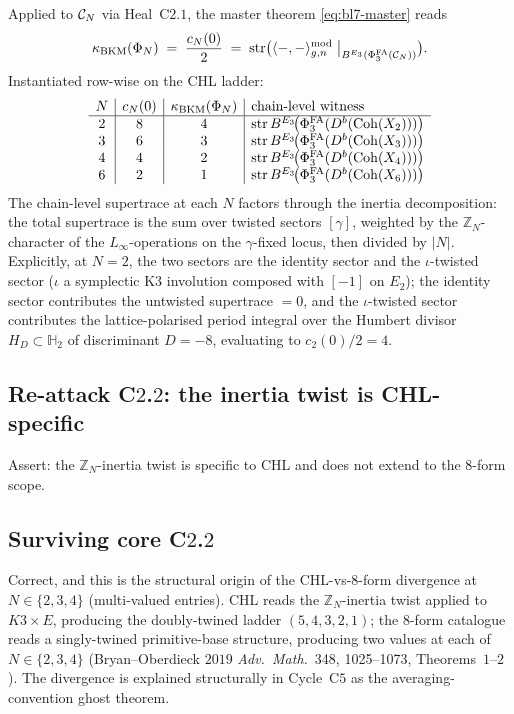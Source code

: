 Applied to $\mathcal{C}_N$ via Heal~C$2$.$1$, the master theorem
\eqref{eq:bl7-master} reads
\[
 \kappa_{\mathrm{BKM}}(\Phi_N) \;=\; \frac{c_N(0)}{2} \;=\;
   \mathrm{str}\bigl(
        \langle -, - \rangle^{\mathrm{mod}}_{g, n}
        \bigm|_{B^{E_{3}}(\Phi^{\mathrm{FA}}_{3}(\mathcal{C}_N))}
    \bigr).
\]
Instantiated row-wise on the CHL ladder:
\[
\begin{array}{c|c|c|l}
 N & c_N(0) & \kappa_{\mathrm{BKM}}(\Phi_N) & \text{chain-level witness} \\ \hline
 2 & 8 & 4 & \mathrm{str}\,B^{E_{3}}\!\bigl(\Phi^{\mathrm{FA}}_{3}(D^b(\mathrm{Coh}(X_2)))\bigr) \\
 3 & 6 & 3 & \mathrm{str}\,B^{E_{3}}\!\bigl(\Phi^{\mathrm{FA}}_{3}(D^b(\mathrm{Coh}(X_3)))\bigr) \\
 4 & 4 & 2 & \mathrm{str}\,B^{E_{3}}\!\bigl(\Phi^{\mathrm{FA}}_{3}(D^b(\mathrm{Coh}(X_4)))\bigr) \\
 6 & 2 & 1 & \mathrm{str}\,B^{E_{3}}\!\bigl(\Phi^{\mathrm{FA}}_{3}(D^b(\mathrm{Coh}(X_6)))\bigr) \\
\end{array}
\]
The chain-level supertrace at each $N$ factors through the inertia
decomposition: the total supertrace is the sum over twisted sectors
$[\gamma]$, weighted by the $\mathbb{Z}_N$-character of the
$L_\infty$-operations on the $\gamma$-fixed locus, then divided by $|N|$.
Explicitly, at $N = 2$, the two sectors are the identity sector and
the $\iota$-twisted sector ($\iota$ a symplectic K$3$ involution
composed with $[-1]$ on $E_2$); the identity sector contributes the
untwisted supertrace $= 0$, and the $\iota$-twisted sector contributes
the lattice-polarised period integral over the Humbert divisor
$H_D \subset \mathbb{H}_2$ of discriminant $D = -8$, evaluating to
$c_2(0)/2 = 4$.

\subsection*{Re-attack C$2$.$2$: the inertia twist is CHL-specific}

Assert: the $\mathbb{Z}_N$-inertia twist is specific to CHL and does not
extend to the 8-form scope.

\subsection*{Surviving core C$2$.$2$}

Correct, and this is the structural origin of the CHL-vs-8-form
divergence at $N \in \{2, 3, 4\}$ (multi-valued entries). CHL reads
the $\mathbb{Z}_N$-inertia twist applied to $K3 \times E$, producing
the doubly-twined ladder $(5, 4, 3, 2, 1)$; the 8-form catalogue reads
a singly-twined primitive-base structure, producing two values at each
of $N \in \{2, 3, 4\}$ (Bryan--Oberdieck $2019$
\emph{Adv.~Math.}~348, 1025--1073, Theorems~$1$--$2$). The divergence
is explained structurally in Cycle~C$5$ as the averaging-convention
ghost theorem.

